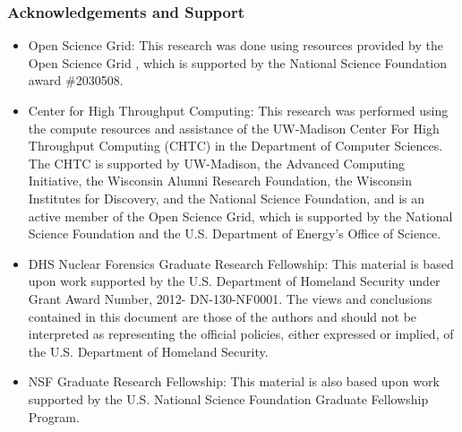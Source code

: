 \begin{frame}
  \frametitle{Acknowledgements and Support}
  \begin{adjustwidth}{-15pt}{0pt}
  \begin{itemize}
    \item Open Science Grid: {\scriptsize This research was done using resources provided by the Open Science Grid \cite{osg07, osg09}, which is supported by the National Science Foundation award \#2030508.}
    \item Center for High Throughput Computing: {\scriptsize This research was performed using the compute resources and assistance of the UW-Madison Center For High Throughput Computing (CHTC) in the Department of Computer Sciences. The CHTC is supported by UW-Madison, the Advanced Computing Initiative, the Wisconsin Alumni Research Foundation, the Wisconsin Institutes for Discovery, and the National Science Foundation, and is an active member of the Open Science Grid, which is supported by the National Science Foundation and the U.S. Department of Energy's Office of Science.}
    \item DHS Nuclear Forensics Graduate Research Fellowship: {\scriptsize This material is based upon work supported by the U.S. Department of Homeland Security under Grant Award Number, 2012- DN-130-NF0001. The views and conclusions contained in this document are those of the authors and should not be interpreted as representing the official policies, either expressed or implied, of the U.S. Department of Homeland Security.}
    \item NSF Graduate Research Fellowship: {\scriptsize This material is also based upon work supported by the U.S. National Science Foundation Graduate Fellowship Program.}
  \end{itemize}
  \end{adjustwidth}
\end{frame}


